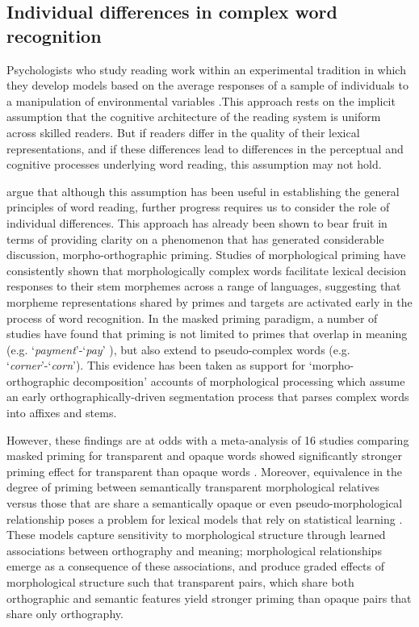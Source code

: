 \documentclass[review]{elsarticle}
\begin{document}
\subsection{Individual differences in complex word recognition}

Psychologists who study reading work within an experimental tradition in which they develop models based on the average responses of a sample of individuals to a manipulation of environmental variables \citep{cronbachTwoDisciplinesScientific1957}.This approach rests on the implicit assumption that the cognitive architecture of the reading system is uniform across skilled readers. But if readers differ in the quality of their lexical representations, and if these differences lead to differences in the perceptual and cognitive processes underlying word reading, this assumption may not hold.

{\renewcommand\&{and}\citet{andrewsMorphologicalPrimingStronger2013}} argue that although this assumption has been useful  in  establishing the general principles of word reading, further progress requires us to consider the role of individual differences.  This approach has already been shown to bear fruit in terms of providing clarity on a  phenomenon that has generated  considerable discussion, morpho-orthographic priming.  Studies of morphological priming have consistently shown that morphologically complex words facilitate lexical decision responses to their stem morphemes across a range of languages, suggesting that morpheme representations shared by primes and targets are activated early in the process of word recognition.  In the masked priming paradigm, a number of studies have found that priming is not limited to primes that overlap in meaning (e.g. `\textit{payment}'-`\textit{pay}' ), but also extend to pseudo-complex words (e.g. `\textit{corner}'-`\textit{corn}').  This evidence has been taken as support for `morpho-orthographic decomposition’ accounts of morphological processing \citep{rastleBrothMyBrother2004, rastleMorphologicalDecompositionBased2008} which assume an early orthographically-driven segmentation process that parses complex words into affixes and stems.

However, these findings are at odds with a  meta-analysis of 16 studies comparing masked priming for transparent and opaque words showed significantly stronger priming effect for transparent than opaque words \citep{feldmanEarlyMorphologicalProcessing2009}. Moreover, equivalence in the degree of priming between semantically transparent morphological relatives versus those that are share a semantically opaque or even pseudo-morphological relationship poses a problem for lexical models that rely on statistical learning \citep{plautAreNonsemanticMorphological2000, baayenAmorphousModelMorphological2011}. These models capture sensitivity to morphological structure through learned associations between orthography and meaning; morphological relationships emerge as a consequence of these associations, and  produce graded effects of morphological structure such that transparent pairs, which share both orthographic and semantic features yield stronger priming than opaque pairs that share only orthography.    
\end{document}
